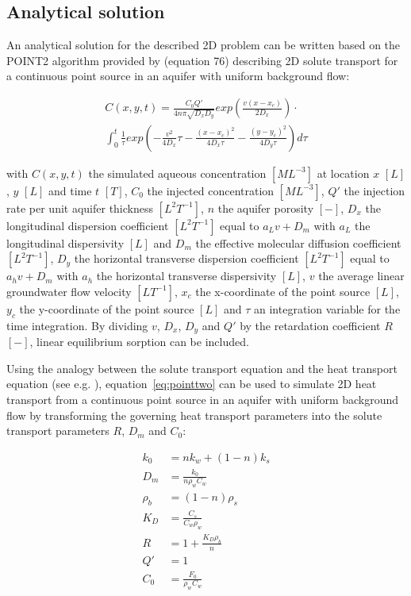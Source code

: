 

\subsection{Analytical solution}

An analytical solution for the described 2D problem can be written based on the POINT2 algorithm provided by \cite{wexler1992} (equation 76) describing 2D solute transport for a continuous point source in an aquifer with uniform background flow:

\begin{multline}
    C(x,y,t) = \frac{C_0Q'}{4n\pi\sqrt{D_xD_y}}exp(\frac{v(x-x_c)}{2D_x})\cdot\\\int_0^t\frac{1}{\tau} exp(-\frac{v^2}{4D_x}\tau - \frac{(x-x_c)^2}{4D_x\tau}-\frac{(y-y_c)^2}{4D_y\tau})d\tau
    \label{eq:pointtwo}
\end{multline}

with $C(x,y,t)$ the simulated aqueous concentration $[ML^{-3}]$ at location $x$ $[L]$, $y$ $[L]$ and time $t$ $[T]$, $C_0$ the injected concentration $[ML^{-3}]$, $Q'$ the injection rate per unit aquifer thickness $[L^2T^{-1}]$, $n$ the aquifer porosity $[-]$, $D_x$ the longitudinal dispersion coefficient $[L^2T^{-1}]$ equal to $a_Lv + D_m$ with $a_L$ the longitudinal dispersivity $[L]$ and $D_m$ the effective molecular diffusion coefficient $[L^2T^{-1}]$, $D_y$ the horizontal transverse dispersion coefficient $[L^2T^{-1}]$ equal to $a_hv + D_m$ with $a_h$ the horizontal transverse dispersivity $[L]$, $v$ the average linear groundwater flow velocity $[LT^{-1}]$, $x_c$ the x-coordinate of the point source $[L]$, $y_c$ the y-coordinate of the point source $[L]$ and $\tau$ an integration variable for the time integration. By dividing $v$, $D_x$, $D_y$ and $Q'$ by the retardation coefficient $R$ $[-]$, linear equilibrium sorption can be included.

Using the analogy between the solute transport equation and the heat transport equation (see e.g. \cite{zheng2010mt3dmsv5.3}), equation~\ref{eq:pointtwo} can be used to simulate 2D heat transport from a continuous point source in an aquifer with uniform background flow by transforming the governing heat transport parameters into the solute transport parameters $R$, $D_m$ and $C_0$:

\begin{align}
    k_0 &= n k_w + (1 - n) k_s \\
    D_m &= \frac{k_0}{n  \rho_w  C_w} \\
    \rho_b &= (1 - n) \rho_s \\
    K_D &= \frac{C_s}{C_w \rho_w} \\
    R &= 1 + \frac{K_D \rho_b}{n} \\
    Q' &= 1 \\
    C_0 &= \frac{F_0}{\rho_w C_w} \\
\end{align}

